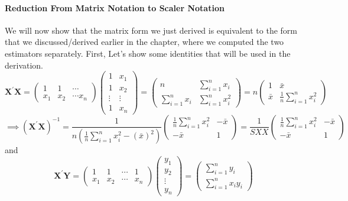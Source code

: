 \documentclass[10pt]{article}
\begin{document}
\paragraph{Reduction From Matrix Notation to Scaler Notation} We will now show that the matrix form we just derived is equivalent to the form that we discussed/derived earlier in the chapter, where we computed the two estimators separately.
First, Let's show some identities that will be used in the derivation.
\begin{equation*}
	\mathbf{X}^{\prime} \mathbf{X}=\left(\begin{array}{ccc}{1} & {1} & {\cdots} \\ {x_{1}} & {x_{2}} & {\cdots x_{n}}\end{array}\right)\left(\begin{array}{cc}{1} & {x_{1}} \\ {1} & {x_{2}} \\ {\vdots} & {\vdots} \\ {1} & {x_{n}}\end{array}\right)=\left(\begin{array}{cc}{n} & {\sum_{i=1}^{n} x_{i}} \\ {\sum_{i=1}^{n} x_{i}} & {\sum_{i=1}^{n} x_{i}^{2}}\end{array}\right)=n\left(\begin{array}{cc}{1} & {\bar{x}} \\ {\bar{x}} & {\frac{1}{n} \sum_{i=1}^{n} x_{i}^{2}}\end{array}\right)
\end{equation*}
\begin{equation*}
	\implies \left(\mathbf{X}^{\prime} \mathbf{X}\right)^{-1}=\frac{1}{n\left(\frac{1}{n} \sum_{i=1}^{n} x_{i}^{2}-(\bar{x})^{2}\right)}\left(\begin{array}{cc}{\frac{1}{n} \sum_{i=1}^{n} x_{i}^{2}} & {-\bar{x}} \\ {-\bar{x}} & {1}\end{array}\right) = \frac{1}{S X X}\left(\begin{array}{cc}{\frac{1}{n} \sum_{i=1}^{n} x_{i}^{2}} & {-\bar{x}} \\ {-\bar{x}} & {1}\end{array}\right)
\end{equation*}
and
\begin{equation*}
	\mathbf{X}^{\prime} \mathbf{Y}=\left(\begin{array}{cccc}{1} & {1} & {\cdots} & {1} \\ {x_{1}} & {x_{2}} & {\cdots} & {x_{n}}\end{array}\right) \left(\begin{array}{c}{y_{1}} \\ {y_{2}} \\ {\vdots} \\ {y_{n}}\end{array}\right) = \left(\begin{array}{c}{\sum_{i=1}^{n} y_{i}} \\ {\sum_{i=1}^{n} x_{i} y_{i}}\end{array}\right)
\end{equation*}
\end{document}
